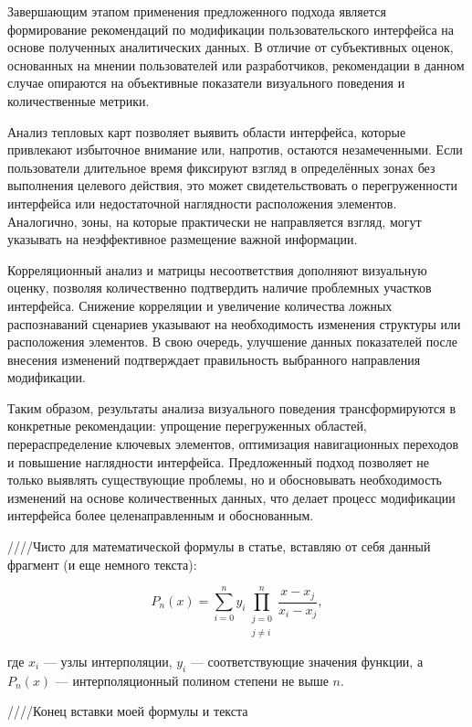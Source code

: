 \documentclass[12pt,a4paper]{article}
\begin{document}
Завершающим этапом применения предложенного подхода является формирование
рекомендаций по модификации пользовательского интерфейса на основе
полученных аналитических данных. В отличие от субъективных оценок,
основанных на мнении пользователей или разработчиков, рекомендации
в данном случае опираются на объективные показатели визуального
поведения и количественные метрики.

Анализ тепловых карт позволяет выявить области интерфейса, которые
привлекают избыточное внимание или, напротив, остаются незамеченными.
Если пользователи длительное время фиксируют взгляд в определённых
зонах без выполнения целевого действия, это может свидетельствовать
о перегруженности интерфейса или недостаточной наглядности расположения
элементов. Аналогично, зоны, на которые практически не направляется
взгляд, могут указывать на неэффективное размещение важной информации.

Корреляционный анализ и матрицы несоответствия дополняют визуальную
оценку, позволяя количественно подтвердить наличие проблемных участков
интерфейса. Снижение корреляции и увеличение количества ложных
распознаваний сценариев указывают на необходимость изменения структуры
или расположения элементов. В свою очередь, улучшение данных показателей
после внесения изменений подтверждает правильность выбранного направления
модификации.

Таким образом, результаты анализа визуального поведения трансформируются
в конкретные рекомендации: упрощение перегруженных областей,
перераспределение ключевых элементов, оптимизация навигационных переходов
и повышение наглядности интерфейса. Предложенный подход позволяет
не только выявлять существующие проблемы, но и обосновывать необходимость
изменений на основе количественных данных, что делает процесс модификации
интерфейса более целенаправленным и обоснованным.

////Чисто для математической формулы в статье, вставляю от себя данный фрагмент 
(и еще немного текста):

\begin{equation}
P_n(x) =
\sum_{i=0}^{n}
y_i
\prod_{\substack{j=0 \\ j \neq i}}^{n}
\frac{x - x_j}{x_i - x_j},
\label{eq:lagrange}
\end{equation}

где $x_i$ --- узлы интерполяции, $y_i$ --- соответствующие значения
функции, а $P_n(x)$ --- интерполяционный полином степени не выше $n$.

////Конец вставки моей формулы и текста 
\end{document}
